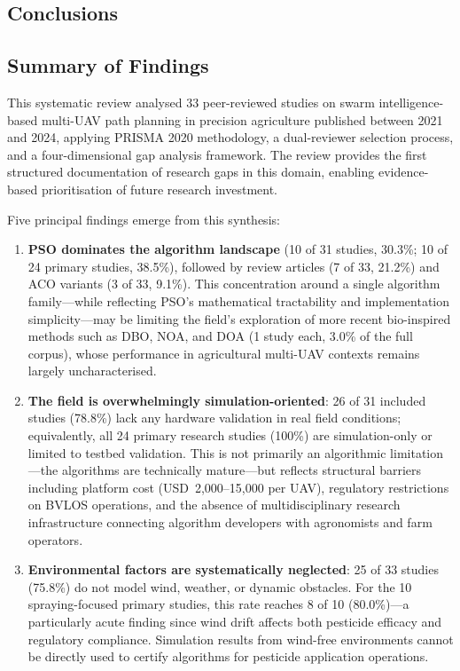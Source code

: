 \documentclass[review,3p,times]{elsarticle}
\begin{document}
\begin{itemize}
{%
\section{Conclusions}

\subsection{Summary of Findings}

This systematic review analysed 33 peer-reviewed studies on swarm intelligence-based multi-UAV path planning in precision agriculture published between 2021 and 2024, applying PRISMA 2020 methodology, a dual-reviewer selection process, and a four-dimensional gap analysis framework. The review provides the first structured documentation of research gaps in this domain, enabling evidence-based prioritisation of future research investment.

Five principal findings emerge from this synthesis:

\begin{enumerate}
  \item \textbf{PSO dominates the algorithm landscape} (10 of 31 studies, 30.3\%; 10 of 24 primary studies, 38.5\%), followed by review articles (7 of 33, 21.2\%) and ACO variants (3 of 33, 9.1\%). This concentration around a single algorithm family---while reflecting PSO's mathematical tractability and implementation simplicity---may be limiting the field's exploration of more recent bio-inspired methods such as DBO, NOA, and DOA (1 study each, 3.0\% of the full corpus), whose performance in agricultural multi-UAV contexts remains largely uncharacterised.

  \item \textbf{The field is overwhelmingly simulation-oriented}: 26 of 31 included studies (78.8\%) lack any hardware validation in real field conditions; equivalently, all 24 primary research studies (100\%) are simulation-only or limited to testbed validation. This is not primarily an algorithmic limitation---the algorithms are technically mature---but reflects structural barriers including platform cost (USD~2,000--15,000 per UAV), regulatory restrictions on BVLOS operations, and the absence of multidisciplinary research infrastructure connecting algorithm developers with agronomists and farm operators.

  \item \textbf{Environmental factors are systematically neglected}: 25 of 33 studies (75.8\%) do not model wind, weather, or dynamic obstacles. For the 10 spraying-focused primary studies, this rate reaches 8 of 10 (80.0\%)---a particularly acute finding since wind drift affects both pesticide efficacy and regulatory compliance. Simulation results from wind-free environments cannot be directly used to certify algorithms for pesticide application operations.


\end{enumerate}}
\end{itemize}
\end{document}
